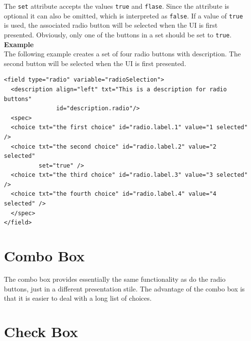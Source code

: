 The \texttt{set} attribute accepts the values \texttt{true} and
\texttt{flase}. Since the attribute is optional it can also be omitted,
which is interpreted as \texttt{false}. If a value of \texttt{true} is
used, the associated radio button will be selected when the UI is first
presented. Obviously, only one of the buttons in a set should be set to
\texttt{true}.\\

\textbf{Example}\\

The following example creates a set of four radio buttons with
description. The second button will be selected when the UI is first
presented.\\

\footnotesize
\begin{verbatim}
<field type="radio" variable="radioSelection">
  <description align="left" txt="This is a description for radio buttons"
               id="description.radio"/>
  <spec>
  <choice txt="the first choice" id="radio.label.1" value="1 selected" />
  <choice txt="the second choice" id="radio.label.2" value="2 selected"
          set="true" />
  <choice txt="the third choice" id="radio.label.3" value="3 selected" />
  <choice txt="the fourth choice" id="radio.label.4" value="4 selected" />
  </spec>
</field>
\end{verbatim}
\normalsize

\section{Combo Box}

The combo box provides essentially the same functionality as do the
radio buttons, just in a different presentation stile. The advantage of
the combo box is that it is easier to deal with a long list of
choices.\\

\section{Check Box}

